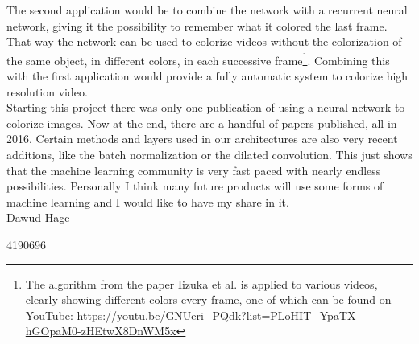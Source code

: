 \documentclass[a4paper]{article}
\begin{document}
The second application would be to combine the network with a recurrent neural network, giving it the possibility to remember what it colored the last frame. That way the network can be used to colorize videos without the colorization of the same object, in different colors, in each successive frame\footnote{The algorithm from the paper Iizuka et al. is applied to various videos, clearly showing different colors every frame, one of which can be found on YouTube: \url{https://youtu.be/GNUeri_PQdk?list=PLoHIT_YpaTX-hGOpaM0-zHEtwX8DnWM5x}}. Combining this with the first application would provide a fully automatic system to colorize high resolution video.\\

Starting this project there was only one publication of using a neural network to colorize images. Now at the end, there are a handful of papers published, all in 2016. Certain methods and layers used in our architectures are also very recent additions, like the batch normalization or the dilated convolution. This just shows that the machine learning community is very fast paced with nearly endless possibilities. Personally I think many future products will use some forms of machine learning and I would like to have my share in it. \\

Dawud Hage

4190696



 
\end{document}
